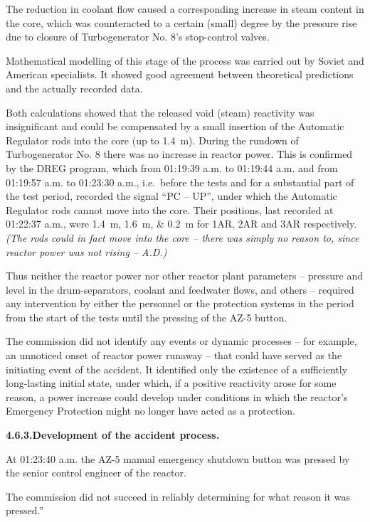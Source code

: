 \documentclass[openright]{bookest}
\begin{document}
\begin{personal}
The reduction in coolant flow caused a corresponding increase in steam content in the core, which was counteracted to a certain (small) degree by the pressure rise due to closure of Turbogenerator No. 8's stop-control valves.

Mathematical modelling of this stage of the process was carried out by Soviet and American specialists. It showed good agreement between theoretical predictions and the actually recorded data.

Both calculations showed that the released void (steam) reactivity was insignificant and could be compensated by a small insertion of the Automatic Regulator rods into the core (up to \qty{1.4}{\metre}). During the rundown of Turbogenerator No. 8 there was no increase in reactor power. This is confirmed by the DREG program, which from 01:19:39 a.m. to 01:19:44 a.m. and from 01:19:57 a.m. to 01:23:30 a.m., i.e.~before the tests and for a substantial part of the test period, recorded the signal ``PC -- UP'', under which the Automatic Regulator rods cannot move into the core. Their positions, last recorded at 01:22:37 a.m., were \qtylist{1.4; 1.6; 0.2}{\metre} for 1AR, 2AR and 3AR respectively. \textit{(The rods could in fact move into the core -- there was simply no reason to, since reactor power was not rising -- A.D.)}

Thus neither the reactor power nor other reactor plant parameters -- pressure and level in the drum-separators, coolant and feedwater flows, and others -- required any intervention by either the personnel or the protection systems in the period from the start of the tests until the pressing of the AZ-5 button.

The commission did not identify any events or dynamic processes -- for example, an unnoticed onset of reactor power runaway -- that could have served as the initiating event of the accident. It identified only the existence of a sufficiently long-lasting initial state, under which, if a positive reactivity arose for some reason, a power increase could develop under conditions in which the reactor's Emergency Protection might no longer have acted as a protection.

\textbf{4.6.3.\quad Development of the accident process.}

At 01:23:40 a.m. the AZ-5 manual emergency shutdown button was pressed by the senior control engineer of the reactor.

The commission did not succeed in reliably determining for what reason it was pressed.''
\end{personal}
\end{document}
